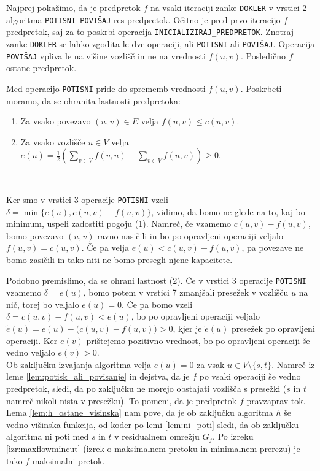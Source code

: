 \documentclass[mat1]{fmfdelo}
\begin{document}
\begin{dokaz}
Najprej pokažimo, da je predpretok $f$ na vsaki iteraciji zanke \texttt{DOKLER} v vrstici 2 algoritma \texttt{POTISNI-POVIŠAJ} res predpretok. Očitno je pred prvo iteracijo $f$ predpretok, saj za to poskrbi operacija \texttt{INICIALIZIRAJ\_PREDPRETOK}. Znotraj zanke \texttt{DOKLER} se lahko zgodita le dve operaciji, ali \texttt{POTISNI} ali \texttt{POVIŠAJ}. Operacija \texttt{POVIŠAJ} vpliva le na višine vozlišč in ne na vrednosti $f(u,v)$. Posledično $f$ ostane predpretok.

Med operacijo \texttt{POTISNI} pride do sprememb vrednosti $f(u,v)$. Poskrbeti moramo, da se ohranita lastnosti predpretoka:\\

\begin{enumerate}
\item Za vsako povezavo $(u,v) \in E$ velja $f(u,v) \leq c(u,v)$.
\item Za vsako vozlišče $u \in V$ velja $e(u) = \frac{1}{2}\left(\sum_{v\in V} f(v,u) - \sum_{v\in V} f(u,v)\right) \geq 0$.
\end{enumerate}~

Ker smo v vrstici 3 operacije \texttt{POTISNI} vzeli $\delta = \min\{e(u), c(u,v) - f(u,v)\}$, vidimo, da bomo ne glede na to, kaj bo minimum, uspeli zadostiti pogoju (1). Namreč, če vzamemo $c(u,v) - f(u,v)$, bomo povezavo $(u,v)$ ravno nasičili in bo po opravljeni operaciji veljalo $f(u,v) = c(u,v)$. Če pa velja $e(u) < c(u,v) - f(u,v)$, pa povezave ne bomo zasičili in tako niti ne bomo presegli njene kapacitete.

Podobno premislimo, da se ohrani lastnost (2). Če v vrstici 3 operacije \texttt{POTISNI} vzamemo $\delta = e(u)$, bomo potem v vrstici 7 zmanjšali presežek v vozlišču $u$ na nič, torej bo veljalo $e(u) = 0$. Če pa bomo vzeli $\delta = c(u,v) - f(u,v) < e(u)$, bo po opravljeni operaciji veljalo $\tilde{e}(u) = e(u) - \big(c(u,v) - f(u,v)\big) > 0$, kjer je $\tilde{e}(u)$ presežek po opravljeni operaciji. Ker $e(v)$ prištejemo pozitivno vrednost, bo po opravljeni operaciji še vedno veljalo $e(v) > 0$.\\

Ob zaključku izvajanja algoritma velja $e(u) = 0$ za vsak $u \in V\setminus \{s,t\}$. Namreč iz leme \ref{lem:potisk_ali_povisanje} in dejstva, da je $f$ po vsaki operaciji še vedno predpretok, sledi, da po zaključku ne morejo obstajati vozlišča s presežki ($s$ in $t$ namreč nikoli nista v presežku). To pomeni, da je predpretok $f$ pravzaprav tok. Lema \ref{lem:h_ostane_visinska} nam pove, da je ob zaključku algoritma $h$ še vedno višinska funkcija, od koder po lemi \ref{lem:ni_poti} sledi, da ob zaključku algoritma ni poti med $s$ in $t$ v residualnem omrežju $G_f$. Po izreku \ref{izr:maxflowmincut} (izrek o maksimalnem pretoku in minimalnem prerezu) je tako $f$ maksimalni pretok.
\end{dokaz}
\end{document}
